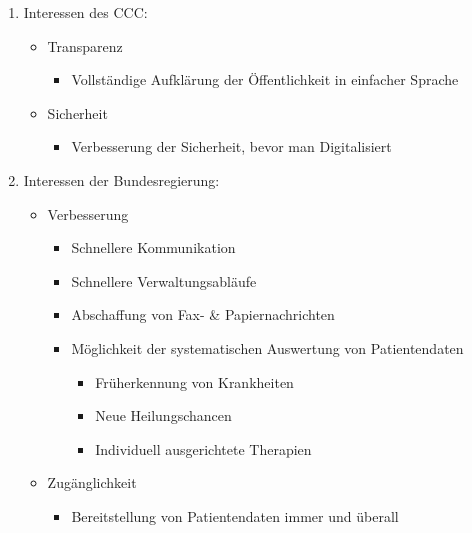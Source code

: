 \documentclass[a4paper]{assignment}
\begin{document}
\begin{problemlist}
\begin{enumerate}

\item Interessen des CCC:

\begin{itemize}

\item Transparenz
\begin{itemize}
	\item Vollständige Aufklärung der Öffentlichkeit in einfacher Sprache
\end{itemize}

\item Sicherheit
\begin{itemize}
	\item Verbesserung der Sicherheit, bevor man Digitalisiert
\end{itemize}
\end{itemize}


\item Interessen der Bundesregierung:\cite{bgm-digitalisierung-im-gesundheitswesen}
\begin{itemize}

\item Verbesserung
\begin{itemize}
	\item Schnellere Kommunikation
	\item Schnellere Verwaltungsabläufe
	\item Abschaffung von Fax- \& Papiernachrichten
	\item Möglichkeit der systematischen Auswertung von Patientendaten
	\begin{itemize}
		\item Früherkennung von Krankheiten
		\item Neue Heilungschancen
		\item Individuell ausgerichtete Therapien
	\end{itemize}
\end{itemize}

\item Zugänglichkeit
\begin{itemize}
	\item Bereitstellung von Patientendaten immer und überall
\end{itemize}
\end{itemize}



\end{enumerate}
\end{problemlist}
\end{document}

